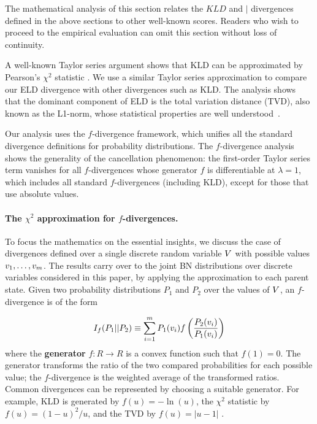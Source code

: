 {The mathematical analysis of this section relates the $KLD$ and $\mid$ divergences defined in the above sections to other well-known scores. Readers who wish to proceed to the empirical evaluation can omit this section without loss of continuity. 

A well-known Taylor series argument shows that KLD can be approximated by Pearson's $\chi^{2}$ statistic \citep{Nielsen2014}. We use a similar Taylor series approximation to compare our ELD divergence with other divergences such as KLD. The analysis shows that the dominant component of ELD is the total variation distance (TVD), also known as the L1-norm, whose statistical properties are well understood~\citep{Beirlant2001,Beirlant1994}. 

Our analysis uses the $f$-divergence framework, which unifies all the standard divergence definitions for probability distributions. The $f$-divergence analysis shows the generality of the cancellation phenomenon: the first-order Taylor series term vanishes for all $f$-divergences whose generator $f$ is differentiable at $\lambda = 1$, which includes all standard $f$-divergences (including KLD), except for those that use absolute values. 

\paragraph{The $\chi^2$ approximation for $f$-divergences.}
To focus the mathematics on the essential insights, we discuss the case of divergences defined over a single discrete random variable $V$ with possible values $v_{1},\ldots,v_{m}$. The results carry over to the joint BN distributions over discrete variables considered in this paper, by applying the approximation to each parent state. Given two probability distributions $P_{1}$ and $P_{2}$ over the values of $V$, an $f$-divergence is of the form 

\begin{equation}
\label{eq:f-divergence}
I_{f}(P_{1}||P_{2}) \equiv \sum_{i=1}^{m} P_{1}(v_{i}) f\left(\frac{P_{2}(v_{i})}{P_{1}(v_{i})}\right)
\end{equation}
%
where the \textbf{generator} $f:R \rightarrow R$ is a convex function such that $f(1)=0$. 
The generator transforms the ratio of the two compared probabilities for each possible value; the $f$-divergence is the weighted average of the transformed ratios. Common divergences can be represented by choosing a suitable generator. For example, KLD is generated by $f(u) = -\ln(u)$, the $\chi^{2}$ statistic by $f(u) = (1-u)^{2}/u$, and the TVD by $f(u) = |u-1|$ \citep{Nielsen2014}. 

}
